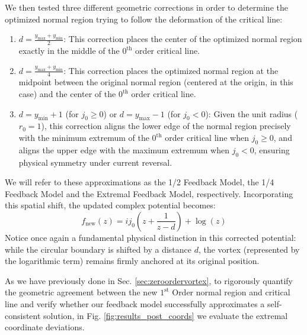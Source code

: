 \documentclass[english,binding=0.6cm,noexaminfo]{sapthesis}
\begin{document}
We then tested three different geometric corrections in order to determine the optimized normal region trying to follow the deformation of the critical line:
\begin{enumerate}
    \item $d = \frac{y_{\text{max}} + y_{\text{min}}}{2}$: This correction places the center of the optimized normal region exactly in the middle of the $0^{\text{th}}$ order critical line.
    \item $d = \frac{y_{\text{max}} + y_{\text{min}}}{4}$: This correction places the optimized normal region at the midpoint between the original normal region (centered at the origin, in this case) and the center of the $0^{\text{th}}$ order critical line.
    \item $d = y_{\text{min}} + 1$ (for $j_0 \ge 0$) or $d = y_{\text{max}} - 1$ (for $j_0 < 0$): Given the unit radius ($r_0=1$), this correction aligns the lower edge of the normal region precisely with the minimum extremum of the $0^{\text{th}}$ order critical line when $j_0 \ge 0$, and aligns the upper edge with the maximum extremum when $j_0 < 0$, ensuring physical symmetry under current reversal.
\end{enumerate}
We will refer to these approximations as the 1/2 Feedback Model, the 1/4 Feedback Model and the Extremal Feedback Model, respectively. Incorporating this spatial shift, the updated complex potential becomes:
\begin{equation}
    f_{\text{new}}(z) = ij_0 \left( z + \frac{1}{z-d} \right) + \log(z)
\end{equation}
Notice once again a fundamental physical distinction in this corrected potential: while the circular boundary is shifted by a distance $d$, the vortex (represented by the logarithmic term) remains firmly anchored at its original position.

As we have previously done in Sec. \ref{sec:zeroordervortex}, to rigorously quantify the geometric agreement between the new $1^{\text{st}}$ Order normal region and critical line and verify whether our feedback model successfully approximates a self-consistent solution, in Fig. \ref{fig:results_post_coords} we evaluate the extremal coordinate deviations. 
\end{document}
